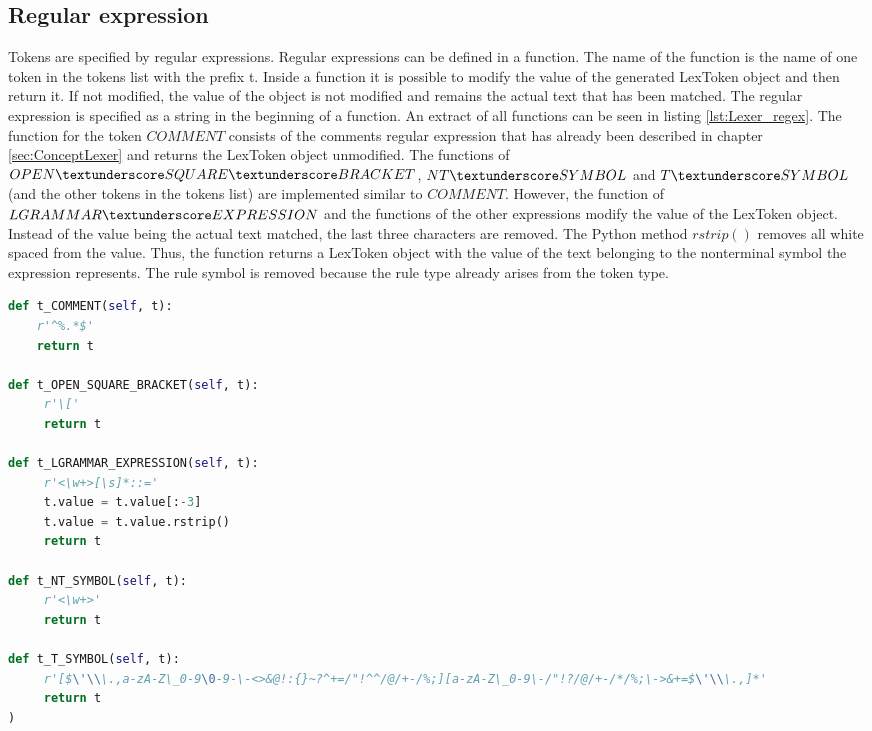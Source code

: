 \subsection{Regular expression}\label{sec:ImplementationLexerRegularExpression}

Tokens are specified by regular expressions. Regular expressions can be defined in a function. The name of the function is the name of one token in the tokens list with the prefix t\textunderscore . Inside a function it is possible to modify the value of the generated LexToken object and then return it. If not modified, the value of the object is not modified and remains the actual text that has been matched. The regular expression is specified as a string in the beginning of a function. An extract of all functions can be seen in listing \ref{lst:Lexer_regex}. The function for the token $COMMENT$ consists of the comments regular expression that has already been described in chapter \ref{sec:ConceptLexer} and returns the LexToken object unmodified. The functions of $OPEN\textunderscore SQUARE\textunderscore BRACKET$, $NT\textunderscore SYMBOL$ and $T\textunderscore SYMBOL$ (and the other tokens in the tokens list) are implemented similar to $COMMENT$. However, the function of $LGRAMMAR\textunderscore EXPRESSION$ and the functions of the other expressions modify the value of the LexToken object. Instead of the value being the actual text matched, the last three characters are removed. The Python method $rstrip()$ removes all white spaced from the value. Thus, the function returns a LexToken object with the value of the text belonging to the nonterminal symbol the expression represents. The rule symbol is removed because the rule type already arises from the token type. \\

\begin{lstlisting}[language=Python,basicstyle=\scriptsize	,caption= Lexer regular expressions,label= lst:Lexer_regex]
def t_COMMENT(self, t):
    r'^%.*$'
    return t

def t_OPEN_SQUARE_BRACKET(self, t):
     r'\['
     return t

def t_LGRAMMAR_EXPRESSION(self, t):
     r'<\w+>[\s]*::='
     t.value = t.value[:-3]
     t.value = t.value.rstrip()
     return t

def t_NT_SYMBOL(self, t):
     r'<\w+>'
     return t

def t_T_SYMBOL(self, t):
     r'[$\'\\\.,a-zA-Z\_0-9\0-9-\-<>&@!:{}~?^+=/"!^^/@/+-/%;][a-zA-Z\_0-9\-/"!?/@/+-/*/%;\->&+=$\'\\\.,]*'
     return t
)
\end{lstlisting}

